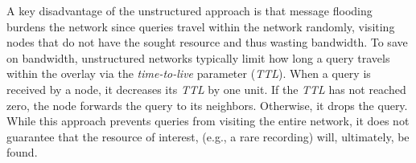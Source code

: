 A key disadvantage of the unstructured approach is that message flooding burdens
the network since queries travel within the network randomly, visiting nodes
that do not have the sought resource and thus wasting bandwidth.  
To save on bandwidth, unstructured networks typically limit how long 
a query travels within the overlay via the \emph{time-to-live} parameter
(\emph{TTL}). 
When a query is received by a node, it decreases its \emph{TTL} by one unit. 
If the \emph{TTL} has not reached zero, the node forwards the query 
to its neighbors.  Otherwise, it drops the query. 
While this approach prevents queries from visiting the entire network, it
does not guarantee that the resource of interest, (e.g., a rare recording)
will, ultimately, be found.
\begin{figure}[ht]
\centering
{}\qquad\qquad
{}
\end{figure}
